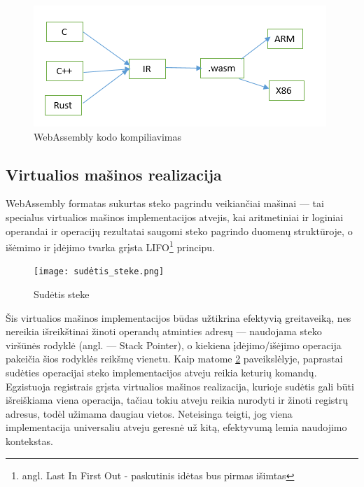 \documentclass{VUMIFPSkursinis}
\begin{document}
\begin{figure}[h!]
  \begin{center}
  \includegraphics[scale=1]{webassembly_kompiliavimas.png}
  \end{center}
  \caption{WebAssembly kodo kompiliavimas \cite{Cla17}}
  \label{fig:wasm_compilation}
\end{figure}

\subsection{Virtualios mašinos realizacija}

WebAssembly formatas sukurtas steko pagrindu veikiančiai mašinai — tai specialus virtualios mašinos implementacijos atvejis, kai aritmetiniai ir loginiai operandai ir operacijų rezultatai saugomi steko pagrindo duomenų struktūroje, o išėmimo ir įdėjimo tvarka grįsta LIFO\footnote{angl. Last In First Out - paskutinis idėtas bus pirmas išimtas} principu. 

\begin{figure}[h!]
  \begin{center}
  \texttt{[image: sudėtis\_steke.png]}
  \end{center}
  \caption{Sudėtis steke}
  \label{fig:stack_addition}
\end{figure}

Šis virtualios mašinos implementacijos būdas užtikrina efektyvią greitaveiką, nes nereikia išreikštinai žinoti operandų atminties adresų — naudojama steko viršūnės rodyklė (angl. — Stack Pointer), o kiekiena įdėjimo/išėjimo operacija pakeičia šios rodyklės reikšmę vienetu.
Kaip matome \ref{fig:stack_addition} paveikslėlyje, paprastai sudėties operacijai steko implementacijos atveju reikia keturių komandų. Egzistuoja registrais grįsta virtualios mašinos realizacija, kurioje sudėtis gali būti išreiškiama viena operacija, tačiau tokiu atveju reikia nurodyti ir žinoti registrų adresus, todėl užimama daugiau vietos. \cite{Sin12} Neteisinga teigti, jog viena implementacija universaliu atveju geresnė už kitą, efektyvumą lemia naudojimo kontekstas.
\end{document}
